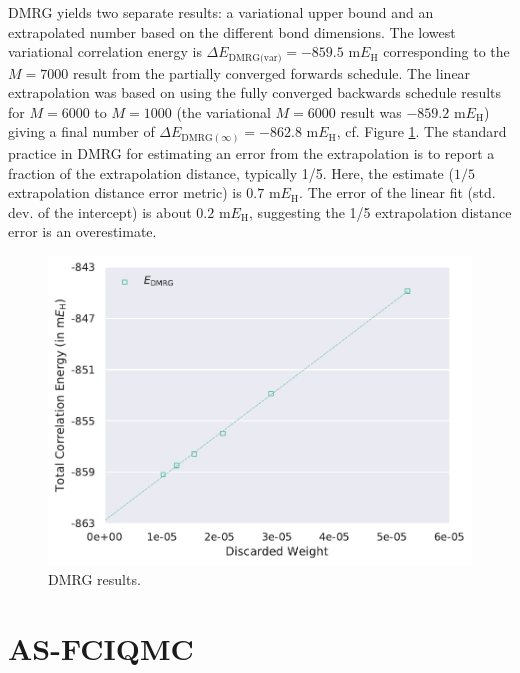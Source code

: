 \documentclass[journal=jcp,manuscript=suppinfo]{achemso}
\begin{document}
DMRG yields two separate results: a variational upper bound and an extrapolated number based on the different bond dimensions.
The lowest variational correlation energy is $\Delta E_{\text{DMRG(var)}} = -859.5$ m$E_{\text{H}}$ corresponding to the 
  $M=7000$ result from the partially converged forwards schedule. The linear extrapolation was based on using the fully converged backwards schedule results for $M=6000$ to $M=1000$ (the
variational $M=6000$ result was $-859.2$ m$E_{\text{H}}$) giving a final number of
$\Delta E_{\text{DMRG}(\infty)} = -862.8$ m$E_{\text{H}}$, cf. Figure \ref{dmrg_SI_fig}.
The standard practice in DMRG for estimating an error from the extrapolation is to report a fraction of the extrapolation distance, typically 1/5.
Here, the estimate ($1/5$ extrapolation distance error metric) is $0.7$ m$E_{\text{H}}$. The error of the linear fit (std. dev. of the intercept) is about $0.2$ m$E_{\text{H}}$, suggesting the 1/5 extrapolation distance error is an overestimate.
%
\begin{figure}[ht!]
\begin{center}
\includegraphics[scale=0.75]{figures/dmrg/dmrg.pdf}
\caption{DMRG results.}
\label{dmrg_SI_fig}
\end{center}
\end{figure}
%

\section{AS-FCIQMC}\label{as_fciqmc_SI_sect}
\end{document}
